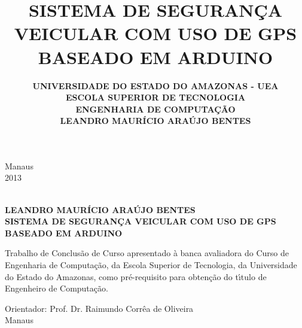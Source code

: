 \documentclass{dcctese}
\begin{document}


\thispagestyle{empty}



\title{ \textbf{SISTEMA DE SEGURAN\c{C}A VEICULAR COM USO DE GPS BASEADO EM ARDUINO}}

\author{ \bf UNIVERSIDADE DO ESTADO DO AMAZONAS - UEA \\[12pt] \bf ESCOLA SUPERIOR DE TECNOLOGIA \\[12pt] \bf ENGENHARIA DE COMPUTA\c{C}\~{A}O \\
	[96pt] \bf LEANDRO MAUR\'{I}CIO ARA\'{U}JO BENTES}

\maketitle

\begin{center}
\large Manaus\\
\large 2013
\end{center}

\newpage


\thispagestyle{empty}
\begin{center}
\textbf{\\[4em]LEANDRO MAUR\'{I}CIO ARA\'{U}JO BENTES\\[5cm]}
\textbf{SISTEMA DE SEGURAN\c{C}A VEICULAR COM USO DE GPS BASEADO EM ARDUINO\\[96pt]}

\end{center}

\hspace*{8cm}
\begin{minipage}{8cm} 
Trabalho de Conclus\~{a}o de Curso
apresentado \`{a} banca avaliadora do Curso de Engenharia de Computa\c{c}\~{a}o, da 
Escola Superior de Tecnologia, da Universidade do Estado do Amazonas, como
pr\'e-requisito para obten\c{c}\~{a}o do t\'{\i}tulo de Engenheiro de Computa\c{c}\~{a}o.\\[50pt] 
\end{minipage} 

\begin{center}
Orientador: Prof. Dr. Raimundo Corr\^{e}a de Oliveira\\[4ex]
\normal Manaus\\
\end{center}
\end{document}

